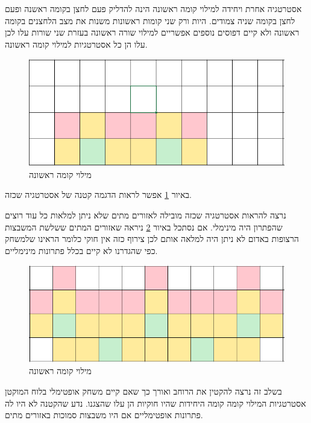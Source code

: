 \documentclass[12pt,leqno]{article}
\theoremstyle{theoremdd}
\begin{document}
אסטרטגיה אחרת ויחידה למילוי קומה ראשונה הינה להדליק 
פעם לחצן בקומה ראשנה 
ופעם לחצן בקומה שניה צמודים.
היות ורק שני קומות ראשונות משנות את מצב הלחצנים בקומה ראשונה ולא קיים דפוסים נוספים
אפשריים למילוי שורה ראשונה בעזרת שני שורות עלו לכן עלו הן כל אסטרטגיות למילוי קומה ראשונה.

\begin{figure}[ht]
    \caption{מילוי קומה ראשונה}
    \label{fig: fill first stage second attempt}
    \centering
    \includegraphics[width=.7\textwidth,height=.7\textheight,keepaspectratio]{images/first_stage_fill_only_first_stage_click.PNG}
\end{figure}

באיור 
\ref{fig: fill first stage second attempt}
אפשר לראות הדגמה קטנה של אסטרטגיה שכזה.

נרצה להראות אסטרטגיה שכזה מובילה לאזורים מתים שלא ניתן למלאות 
כל עוד רוצים שהפתרון היה מינימלי.
אם נסתכל באיור 
\ref{fig: fill first stage second attempt fails}
ניראה שאזורים המתים ששלשת
המשבצות הרצופות באדום לא ניתן היה למלאה אותם לכן צירוף כזה אין חוקי
כלומר הראינו שלמשחק כפי שהגדרנו לא קיים בכלל פתרונות מינימליים.

\begin{figure}[ht]
    \caption{מילוי קומה ראשונה}
    \label{fig: fill first stage second attempt fails}
    \centering
    \includegraphics[width=.7\textwidth,height=.7\textheight,keepaspectratio]{images/first_stage_fill_only_first_stage_click_fail.PNG}
\end{figure}

בשלב זה נרצה להקטין את הרוחב ואורך כך שאם קיים 
משחק אופטימלי בלוח המוקטן אסטרטגיות המילוי קומה קומה היחידות 
שהיו חוקיות הן עלו שהצגנו.
נדע שהקטנה לא היו לה פתרונות אופטימליים אם היו משבצות סמוכות באזורים מתים.
\end{document}
